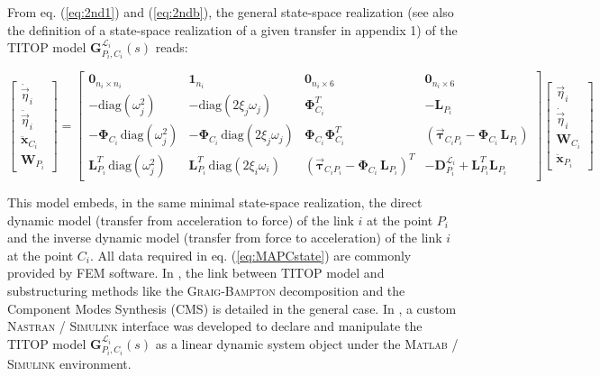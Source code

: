 \documentclass[smallcondensed]{svjour3}     %
\newcommand{\matlab}{\textsc{Matlab }}
\newcommand{\simulink}{\textsc{Simulink }}
\newcommand{\nastran}{\textsc{Nastran }}
\begin{document}
From eq. (\ref{eq:2nd1}) and (\ref{eq:2ndb}), the general state-space realization (see also the definition of a state-space realization of a given transfer in appendix 1) of the TITOP model $\mathbf{G}_{P_i,C_i}^{\mathcal{L}_i}(s)$  reads:

\begin{scriptsize}
\begin{equation}\label{eq:MAPCstate}
\left[ \begin {array}{c} \dot{\vec{\eta}}_i \\ \ddot{\vec{\eta}}_i \\ \hline
\ddot{\mathbf{x}}_{C_i} \\ \mathbf{W}_{P_i}
\end{array} \right] = \left[ \begin {array}{cc|cc} \mathbf{0}_{n_i \times n_i}& \mathbf{1}_{n_i}
& \mathbf{0}_{n_i \times 6} & \mathbf{0}_{n_i \times 6}\\-\mbox{diag}(\omega_j^2) & -\mbox{diag}(2\xi_j\omega_j) & \mathbf{\Phi}_{C_i}^T & -\mathbf{L}_{P_i}\\ \hline
-\mathbf{\Phi}_{C_i}\,\mbox{diag}(\omega_j^2) & -\mathbf{\Phi}_{C_i}\,\mbox{diag}(2\xi_j\omega_j) &
\mathbf{\Phi}_{C_i}\mathbf{\Phi}_{C_i}^T & \left(\mathbf{\vec{\tau}}_{C_iP_i}-\mathbf{\Phi}_{C_i}\,\mathbf{L}_{P_i}\right)\\
\mathbf{L}^T_{P_i}\,\mbox{diag}(\omega_j^2) & \mathbf{L}^T_{P_i}\,\mbox{diag}(2\xi_i\omega_i) &
\left(\mathbf{\vec{\tau}}_{C_iP_i}-\mathbf{\Phi}_{C_i}\,\mathbf{L}_{P_i}\right)^T & -\mathbf{D}^{\mathcal{L}_i}_{P_i}+\mathbf{L}_{P_i}^T\mathbf{L}_{P_i}
\end{array}\right]  
\left[ \begin {array}{c} \vec{\eta}_i \\ \dot{\vec{\eta}}_i \\ \hline \mathbf{W}_{C_i} \\ \ddot{\mathbf{x}}_{P_i}
\end{array} \right]
\end{equation}
\end{scriptsize}


This model embeds, in the same minimal state-space realization, the direct dynamic model (transfer from acceleration to force) of the link $i$ at the point $P_i$ and the inverse dynamic model (transfer from force to acceleration) of the link $i$ at the point $C_i$.  All data required in eq. (\ref{eq:MAPCstate}) are commonly provided by FEM software. In \cite{Perez2015_LM}, the link between TITOP model and substructuring methods like the \textsc{Graig-Bampton} decomposition and the Component Modes Synthesis (CMS) is detailed in the general case. In \cite{Murali2015}, a custom \nastran / \simulink interface was developed to declare and manipulate the TITOP model $\mathbf{G}_{P_i,C_i}^{\mathcal{L}_i}(s)$ as a linear dynamic system object under the \matlab / \simulink environment.
 
\end{document}
